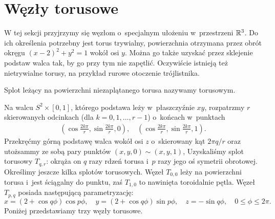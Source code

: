 \section{Węzły torusowe} %
\label{sec:torus}
W tej sekcji przyjrzymy się węzłom o~specjalnym ułożeniu w~przestrzeni $\mathbb R^3$.
Do ich określenia potrzebny jest torus trywialny, powierzchnia otrzymana przez obrót okręgu $(x-2)^2 + y^2 = 1$ wokół osi $y$.
Można go także uzyskać przez sklejenie podstaw walca tak, by go przy tym nie zapętlić.
Oczywiście istnieją też nietrywialne torusy, na przykład rurowe otoczenie trójlistnika.

\begin{definition}
    Splot leżący na powierzchni niezaplątanego torusa nazywamy torusowym.
\end{definition}

Na walcu $S^2 \times [0,1]$, którego podstawa leży w~płaszczyźnie $xy$, rozpatrzmy $r$ skierowanych odcinkach (dla $k = 0, 1, \ldots, r - 1$) o~końcach w~punktach
\begin{align*}
    \left(\cos \frac{2k \pi}{r}, \sin \frac{2k\pi}{r}, 0 \right), \quad
    \left(\cos \frac{2k \pi}{r}, \sin \frac{2k\pi}{r}, 1 \right).
\end{align*}
Przekręćmy górną podstawę walca wokół osi $z$ o~skierowany kąt $2\pi q / r$ oraz utożsammy ze sobą pary punktów $(x, y, 0) \sim (x, y, 1)$,
Uzyskaliśmy splot torusowy $T_{q, r}$: okrąża on $q$ razy rdzeń torusa i~$p$ razy jego oś symetrii obrotowej.
Określimy jeszcze kilka splotów torusowych.
Węzeł $T_{0, 0}$ leży na powierzchni torusa i~jest ściągalny do punktu, zaś $T_{1, 0}$ to nawinięta toroidalnie pętla.
Węzeł $T_{p, q}$ posiada następującą parametryzację:
\[
    x = (2+\cos q \phi) \cos p \phi, \quad
    y = (2+\cos q \phi) \sin p \phi, \quad
    z = - \sin q \phi, \quad
    0 \le \phi \le 2\pi.
\]
Poniżej przedstawiamy trzy węzły torusowe.

